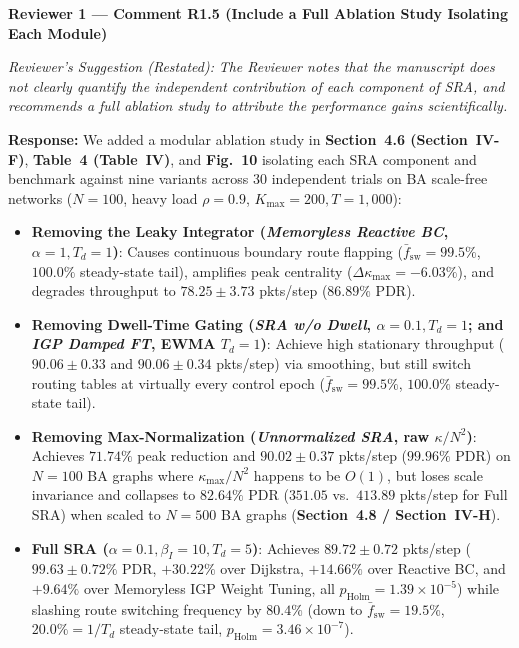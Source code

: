\documentclass[11pt,a4paper]{article}
\newcommand{\cbox}[2]{%
  \vspace{0.6em}\noindent\textbf{#1}\par\smallskip
  \noindent\textit{Reviewer's Suggestion (Restated):} \textit{#2}\par\smallskip
}
\begin{document}
\hrulefill

\cbox{Reviewer 1 --- Comment R1.5 (Include a Full Ablation Study Isolating Each Module)}{The Reviewer notes that the manuscript does not clearly quantify the independent contribution of each component of SRA, and recommends a full ablation study to attribute the performance gains scientifically.}

\noindent\textbf{Response:} We added a modular ablation study in \textbf{Section~4.6 (Section~IV-F)}, \textbf{Table~4 (Table~IV)}, and \textbf{Fig.~10} isolating each SRA component and benchmark against nine variants across 30 independent trials on BA scale-free networks ($N=100$, heavy load $\rho=0.9$, $K_{\max}=200, T=1{,}000$):
\begin{itemize}[leftmargin=1.8em]
    \item \textbf{Removing the Leaky Integrator (\textit{Memoryless Reactive BC}, $\alpha=1, T_d=1$)}: Causes continuous boundary route flapping ($\bar{f}_{\text{sw}} = 99.5\%$, $100.0\%$ steady-state tail), amplifies peak centrality ($\Delta\kappa_{\max} = -6.03\%$), and degrades throughput to $78.25 \pm 3.73$ pkts/step ($86.89\%$ PDR).
    \item \textbf{Removing Dwell-Time Gating (\textit{SRA w/o Dwell}, $\alpha=0.1, T_d=1$; and \textit{IGP Damped FT}, EWMA $T_d=1$)}: Achieve high stationary throughput ($90.06 \pm 0.33$ and $90.06 \pm 0.34$ pkts/step) via smoothing, but still switch routing tables at virtually every control epoch ($\bar{f}_{\text{sw}} = 99.5\%$, $100.0\%$ steady-state tail).
    \item \textbf{Removing Max-Normalization (\textit{Unnormalized SRA}, raw $\kappa/N^2$)}: Achieves $71.74\%$ peak reduction and $90.02 \pm 0.37$ pkts/step ($99.96\%$ PDR) on $N=100$ BA graphs where $\kappa_{\max}/N^2$ happens to be $O(1)$, but loses scale invariance and collapses to $82.64\%$ PDR ($351.05$ vs.\ $413.89$ pkts/step for Full SRA) when scaled to $N=500$ BA graphs (\textbf{Section~4.8 / Section~IV-H}).
    \item \textbf{Full SRA ($\alpha=0.1, \beta_I=10, T_d=5$)}: Achieves $89.72 \pm 0.72$ pkts/step ($99.63 \pm 0.72\%$ PDR, $+30.22\%$ over Dijkstra, $+14.66\%$ over Reactive BC, and $+9.64\%$ over Memoryless IGP Weight Tuning, all $p_{\text{Holm}}=1.39 \times 10^{-5}$) while slashing route switching frequency by \textbf{$80.4\%$} (down to $\bar{f}_{\text{sw}} = 19.5\%$, $20.0\% = 1/T_d$ steady-state tail, $p_{\text{Holm}}=3.46 \times 10^{-7}$).
\end{itemize}
\end{document}
